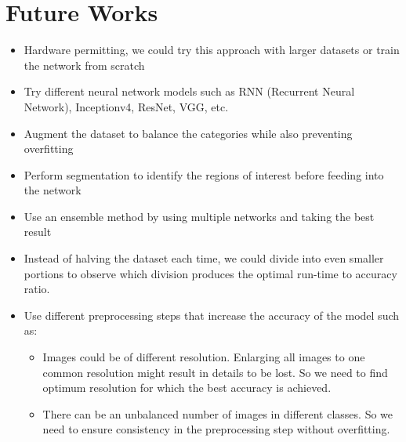 \documentclass[12pt]{report}
\begin{document}
\section{Future Works}
\begin{itemize}
\item Hardware permitting, we could try this approach with larger datasets or train the network from scratch
\item Try different neural network models such as RNN (Recurrent Neural Network), Inceptionv4, ResNet, VGG, etc.
\item Augment the dataset to balance the categories while also preventing overfitting
\item Perform segmentation to identify the regions of interest before feeding into the network
\item Use an ensemble method by using multiple networks and taking the best result
\item Instead of halving the dataset each time, we could divide into even smaller portions to observe which division produces the optimal run-time to accuracy ratio.
\item Use different preprocessing steps that increase the accuracy of the model such as:
\begin{itemize}
\item Images could be of different resolution. Enlarging all images to one common resolution might result in details to be lost. So we need to find optimum resolution for which the best accuracy is achieved.
\item There can be an unbalanced number of images in different classes. So we need to ensure consistency in the preprocessing step without overfitting.
\end{itemize}
\end{itemize}


\end{document}
